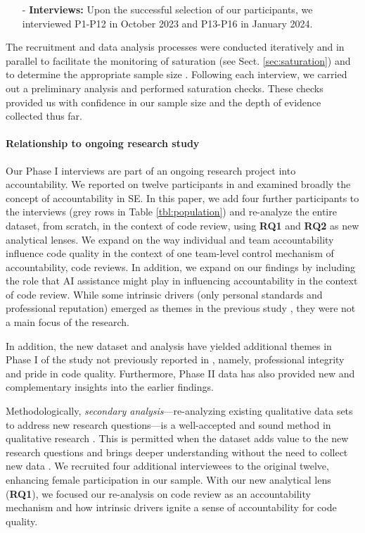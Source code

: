 \begin{itemize}
    \item [-] \textbf{Interviews:} Upon the successful selection of our participants, we interviewed P1-P12 in October 2023 and P13-P16 in January 2024.

\end{itemize}

The recruitment and data analysis processes were conducted iteratively and in parallel to facilitate the monitoring of saturation (see Sect. \ref{sec:saturation}) and to determine the appropriate sample size \citep{patton2014qualitative}. Following each interview, we carried out a preliminary analysis and performed saturation checks. These checks provided us with confidence in our sample size and the depth of evidence collected thus far.

\paragraph*{Relationship to ongoing research study}\label{sec:chase} Our Phase I interviews are part of an ongoing research project into accountability. We reported on twelve participants in \citep{alami2024understanding} and examined broadly the concept of accountability in SE. In this paper, we add four further participants to the interviews (grey rows in Table \ref{tbl:population}) and re-analyze the entire dataset, from scratch, in the context of code review, using \textbf{RQ1} and \textbf{RQ2} as new analytical lenses. We expand on the way individual and team accountability influence code quality in the context of one team-level control mechanism of accountability, code reviews. In addition, we expand on our findings by including the role that AI assistance might play in influencing accountability in the context of code review. While some intrinsic drivers (only personal standards and professional reputation) emerged as themes in the previous study \citep{alami2024understanding}, they were not a main focus of the research.

In addition, the new dataset and analysis have yielded additional themes in Phase I of the study not previously reported in \citep{alami2024understanding}, namely, professional integrity and pride in code quality. Furthermore, Phase II data has also provided new and complementary insights into the earlier findings.

Methodologically, \textit{secondary analysis}---re-analyzing existing qualitative data sets to address new research questions---is a well-accepted and sound method in qualitative research \citep{heaton2008secondary,ruggiano2019conducting}. This is permitted when the dataset adds value to the new research questions and brings deeper understanding without the need to collect new data \citep{heaton2008secondary}. We recruited four additional interviewees to the original twelve, enhancing female participation in our sample. With our new analytical lens (\textbf{RQ1}), we focused our re-analysis on code review as an accountability mechanism and how intrinsic drivers ignite a sense of accountability for code quality.

